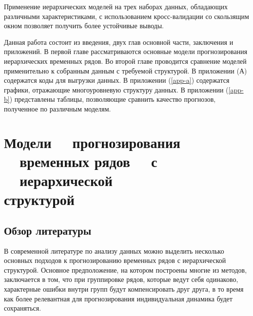 \documentclass[12pt,a4paper, oneside]{extreport}
\begin{document}

Применение иерархических моделей на трех наборах данных, обладающих различными характеристиками,    с использованием кросс-валидации со скользящим окном позволяет получить более устойчивые  выводы. 





Данная работа состоит из введения, двух глав основной части, заключения и приложений. В первой главе рассматриваются основные модели прогнозирования иерархических временных рядов.  Во второй главе проводится  сравнение моделей применительно к собранным данным с требуемой структурой. 
В приложении (А) содержатся коды для выгрузки данных. В приложении (\ref{app-a}) содержатся графики, отражающие многоуровневую структуру данных. В приложении (\ref{app-b}) представлены таблицы, позволяющие сравнить качество прогнозов, полученное по различным моделям. 










\chapter{Модели \ \ прогнозирования \ \ временных рядов \ \   с \ \ иерархической \\ структурой}



\section{Обзор литературы}




В современной  литературе по анализу данных можно выделить несколько основных подходов к  прогнозированию временных рядов с иерархической структурой. 
Основное предположение, на котором построены многие из методов, заключается в том, что при группировке  рядов, которые ведут себя одинаково, характерные ошибки внутри групп будут  компенсировать друг друга, в то время как более релевантная для прогнозирования  индивидуальная динамика будет сохраняться.
\end{document}
